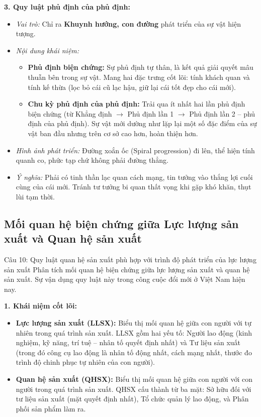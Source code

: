 \documentclass[12pt,a4paper]{article}
\begin{document}
{\noindent
\textbf{3. Quy luật phủ định của phủ định:}
\begin{itemize}
    \item \textit{Vai trò:} Chỉ ra \textbf{Khuynh hướng, con đường} phát triển của sự vật hiện tượng.
    \item \textit{Nội dung khái niệm:}
    \begin{itemize}
        \item \textbf{Phủ định biện chứng:} Sự phủ định tự thân, là kết quả giải quyết mâu thuẫn bên trong sự vật. Mang hai đặc trưng cốt lõi: tính khách quan và tính kế thừa (lọc bỏ cái cũ lạc hậu, giữ lại cái tốt đẹp cho cái mới).
        \item \textbf{Chu kỳ phủ định của phủ định:} Trải qua ít nhất hai lần phủ định biện chứng (từ Khẳng định $\rightarrow$ Phủ định lần 1 $\rightarrow$ Phủ định lần 2 -- phủ định của phủ định). Sự vật mới dường như lặp lại một số đặc điểm của sự vật ban đầu nhưng trên cơ sở cao hơn, hoàn thiện hơn.
    \end{itemize}
    \item \textit{Hình ảnh phát triển:} Đường xoắn ốc (Spiral progression) đi lên, thể hiện tính quanh co, phức tạp chứ không phải đường thẳng.
    \item \textit{Ý nghĩa:} Phải có tinh thần lạc quan cách mạng, tin tưởng vào thắng lợi cuối cùng của cái mới. Tránh tư tưởng bi quan thất vọng khi gặp khó khăn, thụt lùi tạm thời.
\end{itemize}

\subsection{Mối quan hệ biện chứng giữa Lực lượng sản xuất và Quan hệ sản xuất}

\begin{questionbox}{Câu 10: Quy luật quan hệ sản xuất phù hợp với trình độ phát triển của lực lượng sản xuất}
Phân tích mối quan hệ biện chứng giữa lực lượng sản xuất và quan hệ sản xuất. Sự vận dụng quy luật này trong công cuộc đổi mới ở Việt Nam hiện nay.
\end{questionbox}

\noindent
\textbf{1. Khái niệm cốt lõi:}
\begin{itemize}
    \item \textbf{Lực lượng sản xuất (LLSX):} Biểu thị mối quan hệ giữa con người với tự nhiên trong quá trình sản xuất. LLSX gồm hai yếu tố: Người lao động (kinh nghiệm, kỹ năng, trí tuệ -- nhân tố quyết định nhất) và Tư liệu sản xuất (trong đó công cụ lao động là nhân tố động nhất, cách mạng nhất, thước đo trình độ chinh phục tự nhiên của con người).
    \item \textbf{Quan hệ sản xuất (QHSX):} Biểu thị mối quan hệ giữa con người với con người trong quá trình sản xuất. QHSX cấu thành từ ba mặt: Sở hữu đối với tư liệu sản xuất (mặt quyết định nhất), Tổ chức quản lý lao động, và Phân phối sản phẩm làm ra.
\end{itemize}

}
\end{document}
